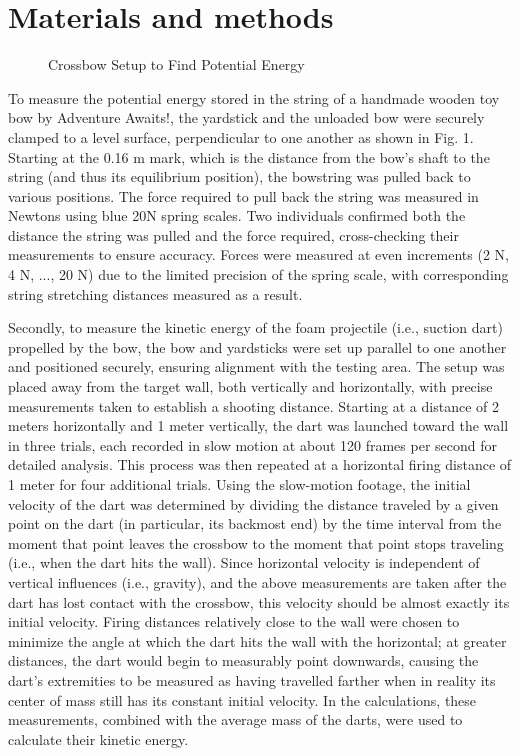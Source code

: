 \documentclass[reprint,amsmath,amssymb,aps,twoside]{revtex4-2}
\begin{document}
\section{Materials and methods}
\begin{figure}
\begin{center}
\end{center}
\caption{\label{fig:1} Crossbow Setup to Find Potential Energy}
\end{figure}
To measure the potential energy stored in the string of a handmade wooden toy bow by Adventure Awaits!, the yardstick and the unloaded bow were securely clamped to a level surface, perpendicular to one another as shown in Fig. 1. Starting at the 0.16 m mark, which is the distance from the bow's shaft to the string (and thus its equilibrium position), the bowstring was pulled back to various positions. The force required to pull back the string was measured in Newtons using blue 20N spring scales. Two individuals confirmed both the distance the string was pulled and the force required, cross-checking their measurements to ensure accuracy. Forces were measured at even increments (2 N, 4 N, ..., 20 N) due to the limited precision of the spring scale, with corresponding string stretching distances measured as a result. 

Secondly, to measure the kinetic energy of the foam projectile (i.e., suction dart) propelled by the bow, the bow and yardsticks were set up parallel to one another and positioned securely, ensuring alignment with the testing area. The setup was placed away from the target wall, both vertically and horizontally, with precise measurements taken to establish a shooting distance. Starting at a distance of 2 meters horizontally and 1 meter vertically, the dart was launched toward the wall in three trials, each recorded in slow motion at about 120 frames per second for detailed analysis. This process was then repeated at a horizontal firing distance of 1 meter for four additional trials. Using the slow-motion footage, the initial velocity of the dart was determined by dividing the distance traveled by a given point on the dart (in particular, its backmost end) by the time interval from the moment that point leaves the crossbow to the moment that point stops traveling (i.e., when the dart hits the wall). Since horizontal velocity is independent of vertical influences (i.e., gravity), and the above measurements are taken after the dart has lost contact with the crossbow, this velocity should be almost exactly its initial velocity. Firing distances relatively close to the wall were chosen to minimize the angle at which the dart hits the wall with the horizontal; at greater distances, the dart would begin to measurably point downwards, causing the dart’s extremities to be measured as having travelled farther when in reality its center of mass still has its constant initial velocity. In the calculations, these measurements, combined with the average mass of the darts, were used to calculate their kinetic energy.
\end{document}
